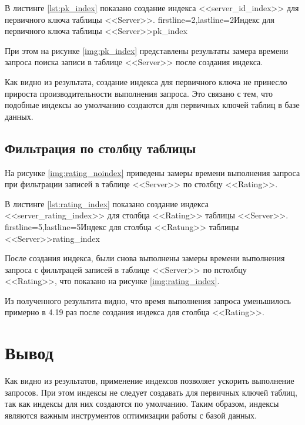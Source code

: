 В листинге \ref{lst:pk_index} показано создание индекса <<server\_id\_index>> для первичного ключа таблицы <<Server>>. 
            {firstline=2,lastline=2}{Индекс для первичного ключа таблицы <<Server>>}{pk_index}{}

При этом на рисунке \ref{img:pk_index} представлены результаты замера времени запроса поиска записи в таблице <<Server>> после создания индекса.

Как видно из результата, создание индекса для первичного ключа не принесло прироста производительности выполнения запроса. Это связано с тем, что подобные индексы ао умолчанию создаются для первичных ключей таблиц в базе данных.


\subsection{Фильтрация по столбцу таблицы}

На рисунке \ref{img:rating_noindex} приведены замеры времени выполнения запроса при фильтрации записей в таблице <<Server>> по столбцу <<Rating>>.

В листинге \ref{lst:rating_index} показано создание индекса <<server\_rating\_index>> для столбца <<Rating>> таблицы <<Server>>. 
            {firstline=5,lastline=5}{Индекс для столбца <<Ratung>> таблицы <<Server>>}{rating_index}{}

После создания индекса, были снова выполнены замеры времени выполнения запроса с фильтрацей записей в таблице <<Server>> по пстолбцу <<Rating>>, что показано на рисунке \ref{img:rating_index}.

Из полученного результита видно, что время выполнения запроса уменьшилось примерно в 4.19 раз после создания индекса для столбца <<Rating>>.


\section*{Вывод}

Как видно из результатов, применение индексов позволяет ускорить выполнение запросов. При этом индексы не следует создавать для первичных ключей таблиц, так как индексы для них создаются по умолчанию. Таким образом, индексы являются важным инструментов оптимизации работы с базой данных.
